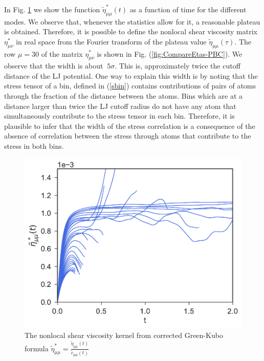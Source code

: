 \documentclass[b5paper,openright,10pt]{book}
\begin{document}
In    Fig.      \ref{fig:EtaStartFourier-PBC}    we    show     the    function
$\tilde{\eta}^{*}_{\mu\mu}(t)$  as a  function of  time for  the different
modes.   We observe  that, whenever  the  statistics allow  for it,  a
reasonable plateau  is obtained. Therefore,  it is possible  to define
the  nonlocal  shear  viscosity  matrix  $\eta^*_{\mu\nu}$ in real space  from  the
Fourier transform  of the plateau  value $\tilde{\eta}_{\mu\mu}(\tau)$.  
The row $\mu=30$ of the matrix $\eta^{*}_{\mu\nu}$ is shown in Fig. (\ref{fig:CompareEtas-PBC}). We observe that the width is about $~5\sigma$. This is, approximately twice the cutoff distance of the LJ potential. 
One way to  explain this width is  by noting
that  the stress  tensor of  a bin,  defined in  (\ref{sbin}) contains
contributions of pairs  of atoms through the fraction  of the distance
between the atoms. Bins which are  at a distance larger than twice the
LJ cutoff radius  do not have any atom  that simultaneously contribute
to the stress tensor in each  bin. Therefore, it is plausible to infer
that the width of the stress correlation is a consequence of the absence
of correlation between the stress through atoms that contribute to the stress
in both bins.
\begin{figure}[h!]
  \centering
\includegraphics[scale=0.41]{EtaStartFourier-PBC}
\caption[The nonlocal shear viscosity kernel for an unconfined fluid]{The nonlocal shear viscosity kernel from corrected Green-Kubo formula $\tilde{\eta}^*_{\mu\mu}=\frac{\tilde{\eta}_{\mu\mu}(t)}{\tilde{c}_{\mu\mu}(t)}$}
\label{fig:EtaStartFourier-PBC}
\end{figure}
\end{document}
